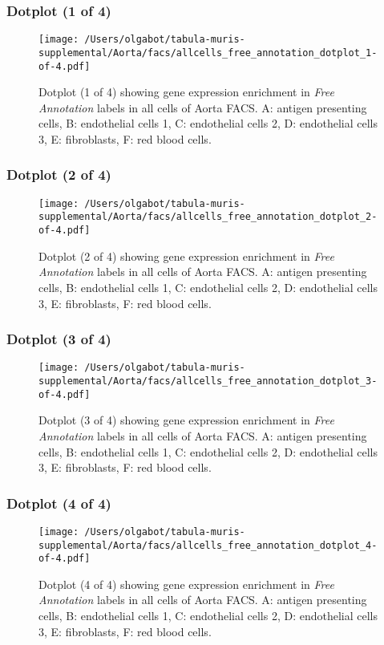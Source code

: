 \subsubsection{Dotplot (1 of 4)}
\begin{figure}[h]
\centering
\texttt{[image: /Users/olgabot/tabula-muris-supplemental/Aorta/facs/allcells\_free\_annotation\_dotplot\_1-of-4.pdf]}

\caption{ Dotplot (1 of 4)  showing gene expression enrichment in \emph{Free Annotation} labels in all cells of Aorta FACS. A: antigen presenting cells, B: endothelial cells 1, C: endothelial cells 2, D: endothelial cells 3, E: fibroblasts, F: red blood cells.}
\end{figure}


\clearpage

\subsubsection{Dotplot (2 of 4)}
\begin{figure}[h]
\centering
\texttt{[image: /Users/olgabot/tabula-muris-supplemental/Aorta/facs/allcells\_free\_annotation\_dotplot\_2-of-4.pdf]}

\caption{ Dotplot (2 of 4)  showing gene expression enrichment in \emph{Free Annotation} labels in all cells of Aorta FACS. A: antigen presenting cells, B: endothelial cells 1, C: endothelial cells 2, D: endothelial cells 3, E: fibroblasts, F: red blood cells.}
\end{figure}


\clearpage

\subsubsection{Dotplot (3 of 4)}
\begin{figure}[h]
\centering
\texttt{[image: /Users/olgabot/tabula-muris-supplemental/Aorta/facs/allcells\_free\_annotation\_dotplot\_3-of-4.pdf]}

\caption{ Dotplot (3 of 4)  showing gene expression enrichment in \emph{Free Annotation} labels in all cells of Aorta FACS. A: antigen presenting cells, B: endothelial cells 1, C: endothelial cells 2, D: endothelial cells 3, E: fibroblasts, F: red blood cells.}
\end{figure}


\clearpage

\subsubsection{Dotplot (4 of 4)}
\begin{figure}[h]
\centering
\texttt{[image: /Users/olgabot/tabula-muris-supplemental/Aorta/facs/allcells\_free\_annotation\_dotplot\_4-of-4.pdf]}

\caption{ Dotplot (4 of 4)  showing gene expression enrichment in \emph{Free Annotation} labels in all cells of Aorta FACS. A: antigen presenting cells, B: endothelial cells 1, C: endothelial cells 2, D: endothelial cells 3, E: fibroblasts, F: red blood cells.}
\end{figure}

